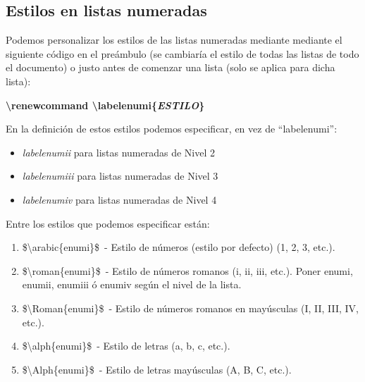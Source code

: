 \documentclass[12pt]{book} %
\begin{document}
\renewcommand\labelitemi{\tiny$\blacksquare$}

\subsection{Estilos en listas numeradas}

Podemos personalizar los estilos de las listas numeradas mediante mediante el siguiente código en el preámbulo (se cambiaría el estilo de todas las listas de todo el documento) o justo antes de comenzar una lista (solo se aplica para dicha lista):

\textbf{\textbackslash renewcommand \textbackslash labelenumi\{\emph{ESTILO}\}}

En la definición de estos estilos podemos especificar, en vez de ``labelenumi'':

\begin{itemize}
	\item \emph{labelenumii} para listas numeradas de Nivel 2
	\item \emph{labelenumiii} para listas numeradas de Nivel 3
	\item \emph{labelenumiv} para listas numeradas de Nivel 4
\end{itemize}

Entre los estilos que podemos especificar están:

\renewcommand\labelenumi{\scriptsize\emph{$\Roman{enumi}$.}}
\begin{enumerate}

	\item \$\textbackslash arabic\{enumi\}\$\ - Estilo de números (estilo por defecto) (1, 2, 3, etc.).
	
	\item \$\textbackslash roman\{enumi\}\$\ - Estilo de números romanos (i, ii, iii, etc.). Poner enumi, enumii, enumiii ó enumiv según el nivel de la lista.

	\item \$\textbackslash Roman\{enumi\}\$\ - Estilo de números romanos en mayúsculas (I, II, III, IV, etc.).

	\item \$\textbackslash alph\{enumi\}\$\ - Estilo de letras (a, b, c, etc.).

	\item \$\textbackslash Alph\{enumi\}\$\ - Estilo de letras mayúsculas (A, B, C, etc.).

\end{enumerate}
\end{document}

